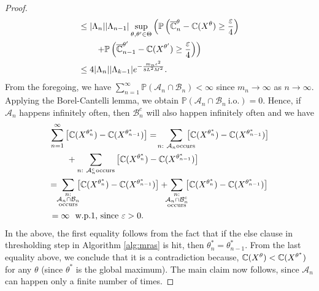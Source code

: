 \begin{proof}
\begin{align*}
&\leq |\Lambda_n||\Lambda_{n-1}|\sup_{\theta,\theta'\in \Theta}\left(\mathbb{P}\left(\overline {\mathbb{C}}_n^{\theta}-\mathbb{C}(X^{\theta})\geq \frac{\varepsilon}{4}\right)\right. \\
&\qquad\left. + \mathbb{P}\left(\overline {\mathbb{C}}_{n-1}^{\theta'}-\mathbb{C}(X^{\theta'})\geq \frac{\varepsilon}{4}\right)\right) \\
&\leq  4|\Lambda_n||\Lambda_{k-1}|
 e^{- \frac{m_n\epsilon^2}{8 L^2 M^2}}.
\end{align*}
From the foregoing, we have $\sum_{n=1}^{\infty}\mathbb{P}\left(\mathcal{A}_n \cap \mathcal{B}_n\right) < \infty$ since $m_n \rightarrow \infty$ as $n\rightarrow \infty$.  Applying the Borel-Cantelli lemma, we obtain
$
\mathbb{P}\left(\mathcal{A}_n \cap \mathcal{B}_n~\mbox{i.o.} \right)=0.
$
Hence, if $\mathcal{A}_n$ happens infinitely often,
then $\mathcal{B}_n^c$ will also happen infinitely often and we have
\begin{align*}
&\sum_{n=1}^{\infty}\big[\C(X^{\theta^*_n})-\C(X^{\theta^*_{n-1}})\big] 
=\!\sum_{n:~\mathcal{A}_n \text{occurs}}\!\!\!\!\!\!\!\big[\C(X^{\theta^*_n})-\C(X^{\theta^*_{n-1}})\big]\\
&\qquad+\sum_{n:~\mathcal{A}_n^c \text{occurs}}\big[\C(X^{\theta^*_n})-\C(X^{\theta^*_{n-1}})\big] \\ 
&\!=\!\!\sum_{\substack{n:\\\mathcal{A}_n\cap \mathcal{B}_n\\ \text{occurs}}}\!\!\!\big[\C(X^{\theta^*_n})-\C(X^{\theta^*_{n-1}})\big] +\!\!\!\sum_{\substack{n:\\\mathcal{A}_n\cap \mathcal{B}_n^c\\ \text{occurs}}}\!\!\!\big[\C(X^{\theta^*_n})-\C(X^{\theta^*_{n-1}})\big] \\ 
&=\infty \text{~~w.p.1, since $\varepsilon>0$.}
\end{align*}
In the above, the first equality follows from the fact that if the else clause in thresholding step in Algorithm \ref{alg:mras} is hit, then $\theta^*_{n} = \theta^*_{n-1}$.
%
From the last equality above, we conclude that it is a contradiction because, $\mathbb{C}(X^{\theta}) < \mathbb{C}(X^{\theta^*})$ for any $\theta$ (since $\theta^*$ is the global maximum). The main claim now follows, since $\mathcal{A}_n$ can happen only a finite number of times.
\end{proof}

